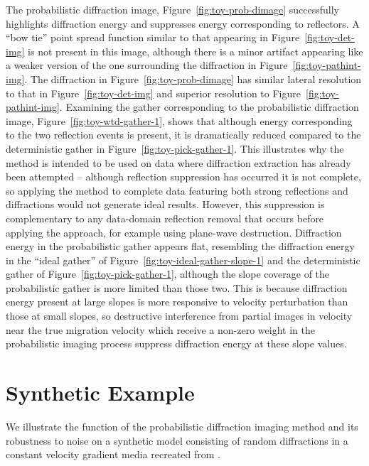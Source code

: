 The probabilistic diffraction image, Figure~\ref{fig:toy-prob-dimage} successfully highlights diffraction energy and suppresses energy corresponding to  reflectors.  A ``bow tie'' point spread function similar to that appearing in Figure~\ref{fig:toy-det-img} is not present in this image, although there is a minor artifact appearing like a weaker version of the one surrounding the diffraction in Figure~\ref{fig:toy-pathint-img}.  The diffraction in Figure~\ref{fig:toy-prob-dimage} has similar lateral resolution to that in Figure~\ref{fig:toy-det-img} and superior resolution to Figure~\ref{fig:toy-pathint-img}.  Examining the gather corresponding to the probabilistic diffraction image, Figure~\ref{fig:toy-wtd-gather-1}, shows that although energy corresponding to the two reflection events is present, it is dramatically reduced compared to the deterministic gather in Figure~\ref{fig:toy-pick-gather-1}. This illustrates why the method is intended to be used on data where diffraction extraction has already been attempted -- although reflection suppression has occurred it is not complete, so applying the method to complete data featuring both strong reflections and diffractions would not generate ideal results.  However, this suppression is complementary to any data-domain reflection removal that occurs before applying the approach, for example using plane-wave destruction.  Diffraction energy in the probabilistic gather appears flat, resembling the diffraction energy in the ``ideal gather'' of Figure~\ref{fig:toy-ideal-gather-slope-1} and the deterministic gather of Figure~\ref{fig:toy-pick-gather-1}, although the slope coverage of the probabilistic gather is more limited than those two.  This is because diffraction energy present at large slopes is more responsive to velocity perturbation than those at small slopes, so destructive interference from partial images in velocity near the true migration velocity which receive a non-zero weight in the probabilistic imaging process suppress diffraction energy at these slope values.

\section{Synthetic Example}

We illustrate the function of the probabilistic diffraction imaging method and its robustness to noise on a synthetic model consisting of random diffractions in a constant velocity gradient media recreated from \cite{deckerovc}.

